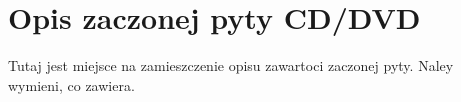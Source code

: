 \chapter{Opis zaczonej pyty CD/DVD}
Tutaj jest miejsce na zamieszczenie opisu zawartoci zaczonej pyty.
Naley wymieni, co zawiera.
